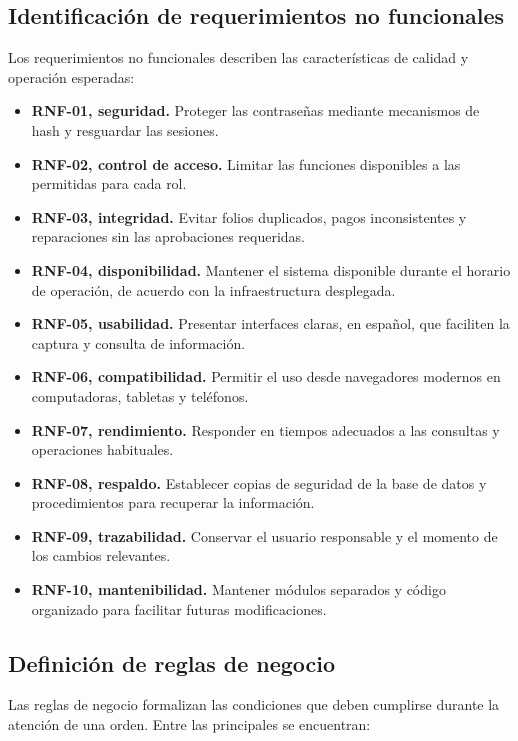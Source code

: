 \subsection{Identificación de requerimientos no funcionales}

Los requerimientos no funcionales describen las características de calidad y operación esperadas:

\begin{itemize}
    \item \textbf{RNF-01, seguridad.} Proteger las contraseñas mediante mecanismos de hash y resguardar las sesiones.
    \item \textbf{RNF-02, control de acceso.} Limitar las funciones disponibles a las permitidas para cada rol.
    \item \textbf{RNF-03, integridad.} Evitar folios duplicados, pagos inconsistentes y reparaciones sin las aprobaciones requeridas.
    \item \textbf{RNF-04, disponibilidad.} Mantener el sistema disponible durante el horario de operación, de acuerdo con la infraestructura desplegada.
    \item \textbf{RNF-05, usabilidad.} Presentar interfaces claras, en español, que faciliten la captura y consulta de información.
    \item \textbf{RNF-06, compatibilidad.} Permitir el uso desde navegadores modernos en computadoras, tabletas y teléfonos.
    \item \textbf{RNF-07, rendimiento.} Responder en tiempos adecuados a las consultas y operaciones habituales.
    \item \textbf{RNF-08, respaldo.} Establecer copias de seguridad de la base de datos y procedimientos para recuperar la información.
    \item \textbf{RNF-09, trazabilidad.} Conservar el usuario responsable y el momento de los cambios relevantes.
    \item \textbf{RNF-10, mantenibilidad.} Mantener módulos separados y código organizado para facilitar futuras modificaciones.
\end{itemize}

\subsection{Definición de reglas de negocio}

Las reglas de negocio formalizan las condiciones que deben cumplirse durante la atención de una orden. Entre las principales se encuentran:

